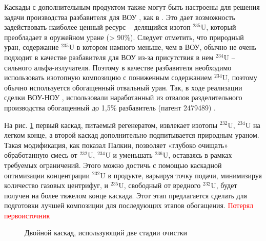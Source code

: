 Каскады с дополнительным продуктом также могут быть настроены для решения задачи производства разбавителя для ВОУ \cite{palkinPOLUChENIERAZBAVITELYaDLYa2017}, как в \cite{shopenSposobPolucheniyaRazbavitelya2008}. Это дает возможность задействовать наиболее ценный ресурс -- делящийся изотоп $^{235}$U, который преобладает в оружейном уране (> 90\%). Следует отметить, что природный уран, содержание $^{235}$U в котором намного меньше, чем в ВОУ, обычно не очень подходит в качестве разбавителя для ВОУ из-за присутствия в нем $^{234}$U -- сильного альфа-излучателя. Поэтому в качестве разбавителя необходимо использовать изотопную композицию с пониженным содержанием $^{234}$U, поэтому обычно используется обогащенный отвальный уран. Так, в ходе реализации сделки ВОУ-НОУ \cite{korotkevichRealizaciyaProgrammyVOUNOU2003}, использовали наработанный из отвалов разделительного производства обогащенный до 1,5\% разбавитель (патент 2479489) \cite{SposobPolucheniyaRazbavitelya}.


На рис. \ref{fig:double_palk} первый каскад, питаемый регенератом, извлекает изотопы $^{232}$U, $^{234}$U на легком конце, а второй каскад дополнительно подпитывается природным ураном. Такая модификация, как показал Палкин, позволяет «глубоко очищать» обработанную смесь от $^{232}$U, $^{234}$U и уменьшать  $^{236}$U, оставаясь в рамках требуемых ограничений. Этого можно достичь с помощью каскадной оптимизации концентрации $^{232}$U в продукте, варьируя точку подачи, минимизируя количество газовых центрифуг, и $^{235}$U, свободный от вредного $^{232}$U, будет получен на более тяжелом конце каскада. Этот этап предлагается сделать для подготовки лучшей композиции для последующих этапов обогащения. \textcolor{red}{Потерял первоисточник}
\begin{figure}[ht]
  \caption{Двойной каскад, использующий две стадии очистки}\label{fig:double_palk}
\end{figure}


